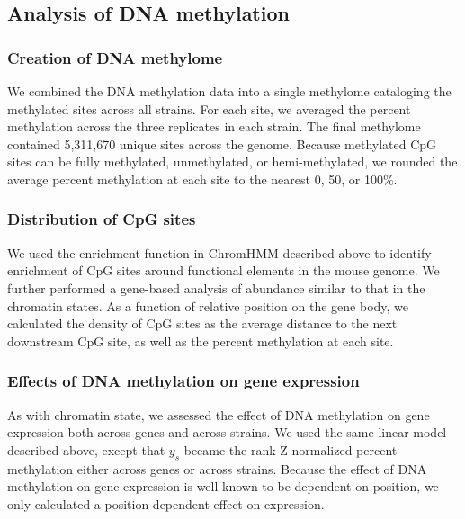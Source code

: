 \documentclass[10pt,letterpaper]{article}
\begin{document}
\hypertarget{analysis-of-dna-methylation}{%
\subsection{Analysis of DNA
methylation}\label{analysis-of-dna-methylation}}

\hypertarget{creation-of-dna-methylome}{%
\subsubsection{Creation of DNA
methylome}\label{creation-of-dna-methylome}}

We combined the DNA methylation data into a single methylome cataloging
the methylated sites across all strains. For each site, we averaged the
percent methylation across the three replicates in each strain. The
final methylome contained 5,311,670 unique sites across the genome.
Because methylated CpG sites can be fully methylated, unmethylated, or
hemi-methylated, we rounded the average percent methylation at each site
to the nearest 0, 50, or 100\%.

\hypertarget{distribution-of-cpg-sites}{%
\subsubsection{Distribution of CpG
sites}\label{distribution-of-cpg-sites}}

We used the enrichment function in ChromHMM described above to identify
enrichment of CpG sites around functional elements in the mouse genome.
We further performed a gene-based analysis of abundance similar to that
in the chromatin states. As a function of relative position on the gene
body, we calculated the density of CpG sites as the average distance to
the next downstream CpG site, as well as the percent methylation at each
site.

\hypertarget{effects-of-dna-methylation-on-gene-expression}{%
\subsubsection{Effects of DNA methylation on gene
expression}\label{effects-of-dna-methylation-on-gene-expression}}

As with chromatin state, we assessed the effect of DNA methylation on
gene expression both across genes and across strains. We used the same
linear model described above, except that \(y_{s}\) became the rank Z
normalized percent methylation either across genes or across strains.
Because the effect of DNA methylation on gene expression is well-known
to be dependent on position, we only calculated a position-dependent
effect on expression.
\end{document}
